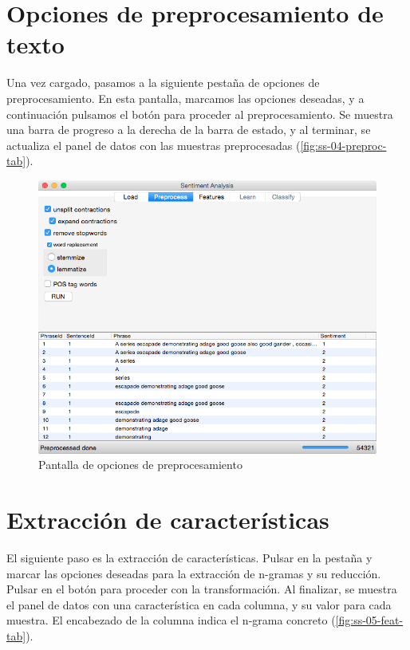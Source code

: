 \newpage
\section{Opciones de preprocesamiento de texto}
\label{sec:manual-preproc}

Una vez cargado, pasamos a la siguiente pestaña de opciones de preprocesamiento. En esta pantalla, marcamos las opciones deseadas, y a continuación pulsamos el botón  para proceder al preprocesamiento. Se muestra una barra de progreso a la derecha de la barra de estado, y al terminar, se actualiza el panel de datos con las muestras preprocesadas (\autoref{fig:ss-04-preproc-tab}).

\begin{figure}[H]
\centering
\includegraphics[width=14cm]{ss-04-preproc-tab}
\caption{Pantalla de opciones de preprocesamiento}
\label{fig:ss-04-preproc-tab}
\end{figure}

\newpage
\section{Extracción de características}
\label{sec:manual-features}

El siguiente paso es la extracción de características. Pulsar en la pestaña y marcar las opciones deseadas para la extracción de n-gramas y su reducción. Pulsar en el botón  para proceder con la transformación. Al finalizar, se muestra el panel de datos con una característica en cada columna, y su valor para cada muestra. El encabezado de la columna indica el n-grama concreto (\autoref{fig:ss-05-feat-tab}).

